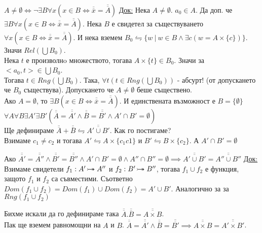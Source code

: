 \documentclass[fleqn, titlepage, 12pt]{report}
\newcommand*\rightbijectionarrow{\mathrel{\ooalign{$\twoheadrightarrow$\cr\hidewidth\hbox{$\rightarrowtail\mkern 1mu$}\cr}}}
\begin{document}
 $A \neq \emptyset \Longleftrightarrow \lnot \exists{B}\forall{x}(x \in B \Leftrightarrow \overline{\overline{x}} = \overline{\overline{A}})$
\bigbreak
\underline{Док:} Нека $A \neq \emptyset$. $a_0 \in A$. Да доп. че $\exists{B}\forall{x}(x \in B \Leftrightarrow \overline{\overline{x}} = \overline{\overline{A}})$.
Нека $B$ е свидетел за съществуването $\forall{x}(x \in B \Leftrightarrow \overline{\overline{x}} = \overline{\overline{A}})$. И нека вземем $B_0 \leftrightharpoons \{w\ |\ w \in B \land \exists{c}(w = A \times \{ c \})\}$.
Значи $Rel(\bigcup B_0)$.\\
Нека $t$ е произволнo множеството, тогава $A \times \{ t \} \in B_0$. Значи за $<a_0,t> \in \bigcup B_0$.\\
Тогава $t \in Rng(\bigcup B_0)$. Така, $\forall{t}(t \in Rng(\bigcup B_0))$ - абсурт! (от допускането че $B_0$ съществува).
\bigbreak
Допускането че $A \neq \emptyset$ беше съществено.\\
Ако $A = \emptyset$, то $\exists{B}(x \in B \Leftrightarrow \overline{\overline{x}} = \overline{\overline{A}})$.
И единствената възможност е $B = \{ \emptyset \}$
\bigbreak
{} $\forall{A}\forall{B}\exists{A'}\exists{B'}(\overline{\overline{A}} = \overline{\overline{A'}} \land \overline{\overline{B}} = \overline{\overline{B'}} \land A' \cap B' = \emptyset )$\\
Ще дефинираме $\overline{\overline{A}} + \overline{\overline{B}} \leftrightharpoons \overline{\overline{A' \cup B'}}$.
Как го постигаме?\\
Взимаме $c_1 \neq c_2$ и тогава $A' \leftrightharpoons A \times \{ c_1c1 \}$ и
$B' \leftrightharpoons B \times \{ c_2 \}$. А $A' \cap B' = \emptyset$
\bigbreak

 Ако $\overline{\overline{A'}} = \overline{\overline{A''}} \land \overline{\overline{B'}} = \overline{\overline{B''}} \land  A' \cap B' = \emptyset \land  A'' \cap B'' = \emptyset \implies \overline{\overline{A' \cup B'}} = \overline{\overline{A'' \cup B''}}$
\bigbreak
\underline{Док:} Взимаме свидетели $f_1: A' \rightbijectionarrow A''$ и $ f_2: B' \rightbijectionarrow B''$, тогава
$f_1 \cup f_2$ е функция, защото $f_1$ и $f_2$ са съвместими.
Съответно $Dom(f_1 \cup f_2) = Dom(f_1) \cup Dom(f_2) = A' \cup B'$. Аналогично за за $Rng(f_1 \cup f_2)$
\bigbreak

 Бихме искали да го дефинираме така
$\overline{\overline{A}}.\overline{\overline{B}} = \overline{\overline{A \times B}}$.\\
Пак ще вземем равномощни на $A$ и $B$.
$\overline{\overline{A}} = \overline{\overline{A'}} \land  \overline{\overline{B}} = \overline{\overline{B'}} \implies
\overline{\overline{A \times  B}} = \overline{\overline{A' \times  B'}}$.
\bigbreak
\end{document}
